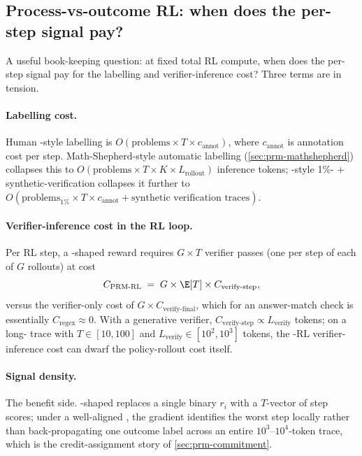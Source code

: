 \subsection{Process-vs-outcome RL: when does the per-step signal pay?}
\label{sec:prm-survival-cost}

A useful book-keeping question: at fixed total RL compute, when does
the per-step  signal pay for the labelling and verifier-inference
cost? Three terms are in tension.

\paragraph{Labelling cost.} Human -style labelling is
$O(\text{problems} \times T \times c_{\text{annot}})$, where
$c_{\text{annot}}$ is annotation cost per step. Math-Shepherd-style
automatic labelling (\cref{sec:prm-mathshepherd}) collapses this to
$O(\text{problems} \times T \times K \times L_{\text{rollout}})$
inference tokens; -style 1\%- + synthetic-verification
collapses it further to $O(\text{problems}_{1\%} \times T \times c_{\text{annot}}
+ \text{synthetic verification traces})$.

\paragraph{Verifier-inference cost in the RL loop.} Per RL step, a
-shaped reward requires $G \times T$ verifier passes (one per step
of each of $G$ rollouts) at cost
\begin{equation}
  C_{\text{PRM-RL}} \;=\; G \times \E[T] \times C_{\text{verify-step}},
  \label{eq:prm-rl-cost}
\end{equation}
versus the verifier-only  cost of $G \times C_{\text{verify-final}}$,
which for an answer-match check is essentially $C_{\text{regex}}
\approx 0$. With a generative verifier, $C_{\text{verify-step}}
\propto L_{\text{verify}}$ tokens; on a long- trace with $T \in
[10, 100]$ and $L_{\text{verify}} \in [10^2, 10^3]$ tokens, the -RL
verifier-inference cost can dwarf the policy-rollout cost itself.

\paragraph{Signal density.} The benefit side. -shaped  replaces
a single binary $r_i$ with a $T$-vector of step scores; under a
well-aligned , the gradient identifies the worst step locally
rather than back-propagating one outcome label across an entire
$10^3$--$10^4$-token trace, which is the credit-assignment story of
\cref{sec:prm-commitment}.

